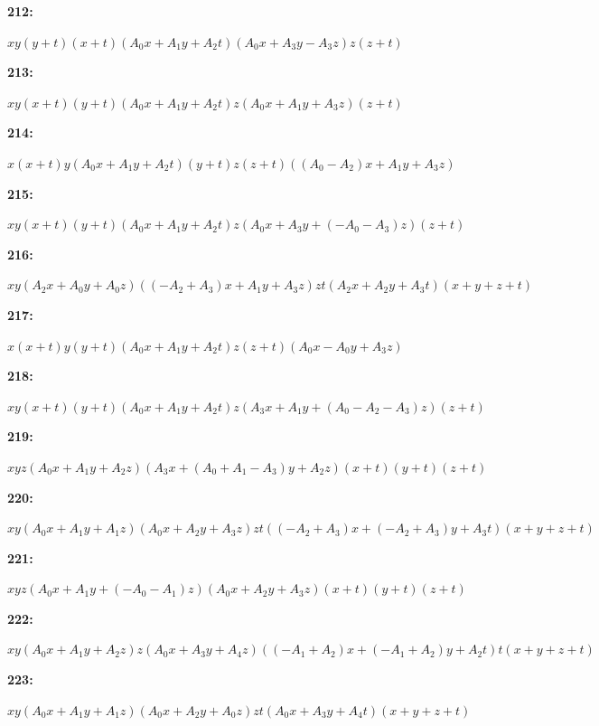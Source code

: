 \documentclass[12pt]{amsart}
\theoremstyle{plain}
\theoremstyle{remark}
\theoremstyle{definition}
\numberwithin{table}{section}
\begin{document}
\noindent\parbox[right]{9mm}{\textbf{212:}}\parbox{3mm}{\hfill}%
\parbox[t]{15cm}{\(xy(y + t)(x + t)(A_{0}x + A_{1}y + A_{2}t)(A_{0}x + A_{3}y - A_{3}z)z(z + t)\)}

\noindent\parbox[right]{9mm}{\textbf{213:}}\parbox{3mm}{\hfill}%
\parbox[t]{15cm}{\(xy(x + t)(y + t)(A_{0}x + A_{1}y + A_{2}t)z(A_{0}x + A_{1}y + A_{3}z)(z + t)\)}

\noindent\parbox[right]{9mm}{\textbf{214:}}\parbox{3mm}{\hfill}%
\parbox[t]{15cm}{\(x(x + t)y(A_{0}x + A_{1}y + A_{2}t)(y + t)z(z + t)((A_{0} - A_{2})x + A_{1}y + A_{3}z)\)}

\noindent\parbox[right]{9mm}{\textbf{215:}}\parbox{3mm}{\hfill}%
\parbox[t]{15cm}{\(xy(x + t)(y + t)(A_{0}x + A_{1}y + A_{2}t)z(A_{0}x + A_{3}y + (-A_{0} - A_{3})z)(z + t)\)}

\noindent\parbox[right]{9mm}{\textbf{216:}}\parbox{3mm}{\hfill}%
\parbox[t]{15cm}{\(xy(A_{2}x + A_{0}y + A_{0}z)((-A_{2} + A_{3})x + A_{1}y + A_{3}z)zt(A_{2}x + A_{2}y + A_{3}t)(x + y + z + t)\)}

\noindent\parbox[right]{9mm}{\textbf{217:}}\parbox{3mm}{\hfill}%
\parbox[t]{15cm}{\(x(x + t)y(y + t)(A_{0}x + A_{1}y + A_{2}t)z(z + t)(A_{0}x - A_{0}y + A_{3}z)\)}

\noindent\parbox[right]{9mm}{\textbf{218:}}\parbox{3mm}{\hfill}%
\parbox[t]{15cm}{\(xy(x + t)(y + t)(A_{0}x + A_{1}y + A_{2}t)z(A_{3}x + A_{1}y + (A_{0} - A_{2} - A_{3})z)(z + t)\)}

\noindent\parbox[right]{9mm}{\textbf{219:}}\parbox{3mm}{\hfill}%
\parbox[t]{15cm}{\(xyz(A_{0}x + A_{1}y + A_{2}z)(A_{3}x + (A_{0} + A_{1} - A_{3})y + A_{2}z)(x + t)(y + t)(z + t)\)}

\noindent\parbox[right]{9mm}{\textbf{220:}}\parbox{3mm}{\hfill}%
\parbox[t]{15cm}{\(xy(A_{0}x + A_{1}y + A_{1}z)(A_{0}x + A_{2}y + A_{3}z)zt((-A_{2} + A_{3})x + (-A_{2} + A_{3})y + A_{3}t)(x + y + z + t)\)}

\noindent\parbox[right]{9mm}{\textbf{221:}}\parbox{3mm}{\hfill}%
\parbox[t]{15cm}{\(xyz(A_{0}x + A_{1}y + (-A_{0} - A_{1})z)(A_{0}x + A_{2}y + A_{3}z)(x + t)(y + t)(z + t)\)}

\noindent\parbox[right]{9mm}{\textbf{222:}}\parbox{3mm}{\hfill}%
\parbox[t]{15cm}{\(xy(A_{0}x + A_{1}y + A_{2}z)z(A_{0}x + A_{3}y + A_{4}z)((-A_{1} + A_{2})x + (-A_{1} + A_{2})y + A_{2}t)t(x + y + z + t)\)}

\noindent\parbox[right]{9mm}{\textbf{223:}}\parbox{3mm}{\hfill}%
\parbox[t]{15cm}{\(xy(A_{0}x + A_{1}y + A_{1}z)(A_{0}x + A_{2}y + A_{0}z)zt(A_{0}x + A_{3}y + A_{4}t)(x + y + z + t)\)}
\end{document}
